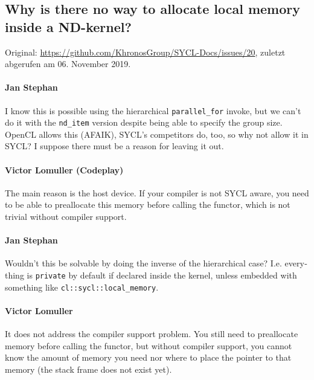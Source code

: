\subsection{Why is there no way to allocate local memory inside a ND-kernel?}
\label{anhang:diskussionen:syclspec:staticshared}

Original: \url{https://github.com/KhronosGroup/SYCL-Docs/issues/20}, zuletzt
abgerufen am 06. November 2019.

\begin{otherlanguage}{english}
    \paragraph{Jan Stephan} I know this is possible using the hierarchical
                            \texttt{parallel\_for} invoke, but we can't do it
                            with the \texttt{nd\_item} version despite being
                            able to specify the group size. OpenCL allows this
                            (AFAIK), SYCL's competitors do, too, so why not
                            allow it in SYCL? I suppose there must be a reason
                            for leaving it out.
    \paragraph{Victor Lomuller (Codeplay)} The main reason is the host device.
                            If your compiler is not SYCL aware, you need to be
                            able to preallocate this memory before calling the
                            functor, which is not trivial without compiler
                            support.
    \paragraph{Jan Stephan} Wouldn't this be solvable by doing the inverse of
                            the hierarchical case? I.e. everything is
                            \texttt{private} by default if declared inside the
                            kernel, unless embedded with something like
                            \texttt{cl::sycl::local\_memory}.
    \paragraph{Victor Lomuller} It does not address the compiler support
                                problem. You still need to preallocate memory
                                before calling the functor, but without compiler
                                support, you cannot know the amount of memory
                                you need nor where to place the pointer to that
                                memory (the stack frame does not exist yet).

\end{otherlanguage}
